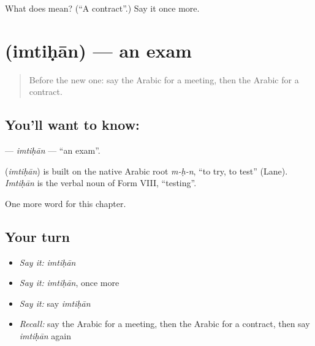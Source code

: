 \begin{tcolorbox}[breakable,colback=teal!4,colframe=teal!35!black,title={Before you move on}]
What does  mean? (\textquotedblleft{}A contract\textquotedblright{}.) Say it once more.
\end{tcolorbox}
\section[\texorpdfstring{\ar{امتحان} (imtiḥān)}{امتحان (imtiḥān)}]{ (imtiḥān) — an exam}

\label{lesson:AR-C221-imtihan}



\begin{quote}
Before the new one: say the Arabic for a meeting, then the Arabic for a contract.
\end{quote}

\subsection*{You'll want to know: }
\textbf{} — \emph{imtiḥān} — \textquotedblleft{}an exam\textquotedblright{}.

\begin{cousinweb}
\textbf{} (\emph{imtiḥān}) is built on the native Arabic root \emph{m-ḥ-n}, \textquotedblleft{}to try, to test\textquotedblright{} (Lane). \emph{Imtiḥān} is the verbal noun of Form VIII, \textquotedblleft{}testing\textquotedblright{}.
\end{cousinweb}

\begin{grammarlens}[title={What you've built}]
One more word for this chapter.
\end{grammarlens}

\subsection*{Your turn}
\begin{itemize}
\raggedright
  \item \emph{Say it:} \emph{imtiḥān}
  \item \emph{Say it:} \emph{imtiḥān}, once more
  \item \emph{Say it:} say \emph{imtiḥān}
  \item \emph{Recall:} say the Arabic for a meeting, then the Arabic for a contract, then say \emph{imtiḥān} again
\end{itemize}

